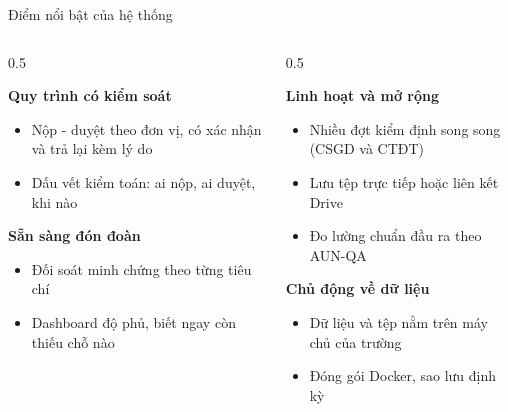 \documentclass[aspectratio=169, 11pt]{beamer}
\begin{document}
\begin{frame}{Điểm nổi bật của hệ thống}
\vspace{0.15cm}
\begin{columns}[T]
\begin{column}{0.5\textwidth}
\begin{tcolorbox}[enhanced, colback=lightwarm, colframe=daumaroon, boxrule=0pt, leftrule=3pt, arc=2pt, fontupper=\footnotesize]
\textbf{\color{daumaroon}Quy trình có kiểm soát}
\begin{itemize}\scriptsize
  \item Nộp - duyệt theo đơn vị, có xác nhận và trả lại kèm lý do
  \item Dấu vết kiểm toán: ai nộp, ai duyệt, khi nào
\end{itemize}
\end{tcolorbox}
\vspace{0.1cm}
\begin{tcolorbox}[enhanced, colback=lightnavy, colframe=daunavy, boxrule=0pt, leftrule=3pt, arc=2pt, fontupper=\footnotesize]
\textbf{\color{daunavy}Sẵn sàng đón đoàn}
\begin{itemize}\scriptsize
  \item Đối soát minh chứng theo từng tiêu chí
  \item Dashboard độ phủ, biết ngay còn thiếu chỗ nào
\end{itemize}
\end{tcolorbox}
\end{column}
\begin{column}{0.5\textwidth}
\begin{tcolorbox}[enhanced, colback=lightgreen, colframe=okgreen, boxrule=0pt, leftrule=3pt, arc=2pt, fontupper=\footnotesize]
\textbf{\color{okgreen}Linh hoạt và mở rộng}
\begin{itemize}\scriptsize
  \item Nhiều đợt kiểm định song song (CSGD và CTĐT)
  \item Lưu tệp trực tiếp hoặc liên kết Drive
  \item Đo lường chuẩn đầu ra theo AUN-QA
\end{itemize}
\end{tcolorbox}
\vspace{0.1cm}
\begin{tcolorbox}[enhanced, colback=lightgold, colframe=daugold!80!black, boxrule=0pt, leftrule=3pt, arc=2pt, fontupper=\footnotesize]
\textbf{\color{daunavy}Chủ động về dữ liệu}
\begin{itemize}\scriptsize
  \item Dữ liệu và tệp nằm trên máy chủ của trường
  \item Đóng gói Docker, sao lưu định kỳ
\end{itemize}
\end{tcolorbox}
\end{column}
\end{columns}
\end{frame}
\end{document}
